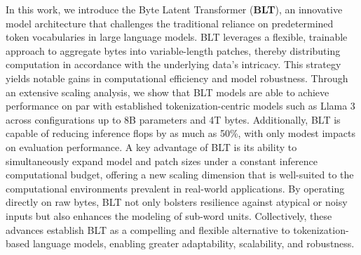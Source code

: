 In this work, we introduce the Byte Latent Transformer (\textbf{BLT}), an innovative model architecture that challenges the traditional reliance on predetermined token vocabularies in large language models. {\textsc BLT} leverages a flexible, trainable approach to aggregate bytes into variable-length patches, thereby distributing computation in accordance with the underlying data’s intricacy. This strategy yields notable gains in computational efficiency and model robustness. Through an extensive scaling analysis, we show that {\textsc BLT} models are able to achieve performance on par with established tokenization-centric models such as Llama 3 across configurations up to 8B parameters and 4T bytes. Additionally, {\textsc BLT} is capable of reducing inference flops by as much as 50\%, with only modest impacts on evaluation performance. A key advantage of {\textsc BLT} is its ability to simultaneously expand model and patch sizes under a constant inference computational budget, offering a new scaling dimension that is well-suited to the computational environments prevalent in real-world applications. By operating directly on raw bytes, {\textsc BLT} not only bolsters resilience against atypical or noisy inputs but also enhances the modeling of sub-word units. Collectively, these advances establish {\textsc BLT} as a compelling and flexible alternative to tokenization-based language models, enabling greater adaptability, scalability, and robustness.


